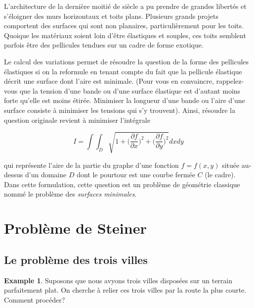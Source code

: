 \documentclass[10pt,a4paper]{article}%
\theoremstyle{theorem}
\theoremstyle{definition}
\newtheorem{example}{Example}
\begin{document}
	L’architecture de la dernière moitié de siècle a pu prendre de grandes libertés et
	s’éloigner des murs horizontaux et toits plans. Plusieurs grands projets comportent des
	surfaces qui sont non planaires, particulièrement pour les toits. Quoique les matériaux soient loin d’être élastiques et souples, ces toits semblent parfois être des pellicules
	tendues sur un cadre de forme exotique. 
	
	Le calcul des variations permet de résoudre la question de la forme des pellicules élastiques si on la reformule en tenant compte du fait que la pellicule élastique décrit une surface dont l’aire est minimale. (Pour vous en convaincre, rappelez-vous que la tension d’une bande ou d’une surface élastique est d’autant moins forte qu’elle est moins étirée. Minimiser la longueur d’une bande ou l’aire d’une surface consiste à minimiser les tensions qui s’y trouvent). Ainsi, résoudre la question originale revient à minimiser l’intégrale
	
	\begin{equation}
	I=\int \int_D \sqrt{1+\bigg(\frac{\partial f}{\partial x}\bigg)^2+\bigg(\frac{\partial f}{\partial y}\bigg)^2} dxdy
	\end{equation}
	
	qui représente l’aire de la partie du graphe d’une fonction $f = f(x, y)$ située au-dessus
	d’un domaine $D$ dont le pourtour est une courbe fermée $C$ (le cadre). Dans cette formulation, cette question est un problème de géométrie classique nommé le problème des
	\textit{surfaces minimales}.
	
	
		
	\section{Problème de Steiner}\label{sec5}
		\subsection{Le problème des trois villes}\label{troisvilles}
		
		\begin{example}
			 Suposons que nous avyons trois villes disposées sur un terrain parfaitement plat. On cherche à relier ces trois villes par la route la plus courte. Comment procéder?
		\end{example}
		
\end{document}
